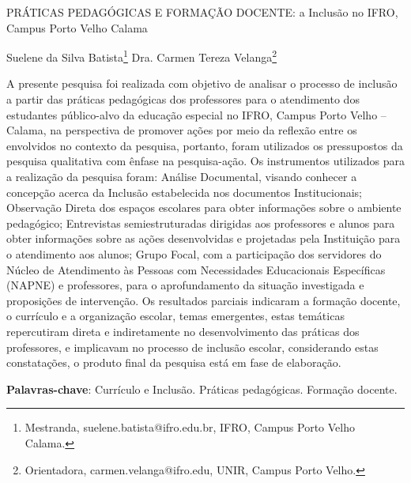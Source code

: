 \documentclass[article,12pt,onesidea,4paper,english,brazil]{abntex2}
\begin{document}
	
	
	\frenchspacing 
	
	\begin{center}
		\LARGE PRÁTICAS PEDAGÓGICAS E FORMAÇÃO DOCENTE: a Inclusão no IFRO, Campus Porto Velho Calama
		
		\normalsize
		Suelene da Silva Batista\footnote{Mestranda, suelene.batista@ifro.edu.br, IFRO, Campus Porto Velho Calama.} 
		Dra. Carmen Tereza Velanga\footnote{Orientadora, carmen.velanga@ifro.edu, UNIR, Campus Porto Velho.}
	\end{center}
	
	\noindent A presente pesquisa foi realizada com objetivo de analisar o processo de inclusão a
	partir das práticas pedagógicas dos professores para o atendimento dos estudantes
	público-alvo da educação especial no IFRO, Campus Porto Velho – Calama, na
	perspectiva de promover ações por meio da reflexão entre os envolvidos no contexto
	da pesquisa, portanto, foram utilizados os pressupostos da pesquisa qualitativa com
	ênfase na pesquisa-ação. Os instrumentos utilizados para a realização da pesquisa
	foram: Análise Documental, visando conhecer a concepção acerca da Inclusão
	estabelecida nos documentos Institucionais; Observação Direta dos espaços
	escolares para obter informações sobre o ambiente pedagógico; Entrevistas
	semiestruturadas dirigidas aos professores e alunos para obter informações sobre
	as ações desenvolvidas e projetadas pela Instituição para o atendimento aos alunos;
	Grupo Focal, com a participação dos servidores do Núcleo de Atendimento às
	Pessoas com Necessidades Educacionais Específicas (NAPNE) e professores, para
	o aprofundamento da situação investigada e proposições de intervenção. Os
	resultados parciais indicaram a formação docente, o currículo e a organização
	escolar, temas emergentes, estas temáticas repercutiram direta e indiretamente no
	desenvolvimento das práticas dos professores, e implicavam no processo de
	inclusão escolar, considerando estas constatações, o produto final da pesquisa está
	em fase de elaboração.
	
	\vspace{\onelineskip}
	
	\noindent
	\textbf{Palavras-chave}: Currículo e Inclusão. Práticas pedagógicas. Formação docente.
	
\end{document}
